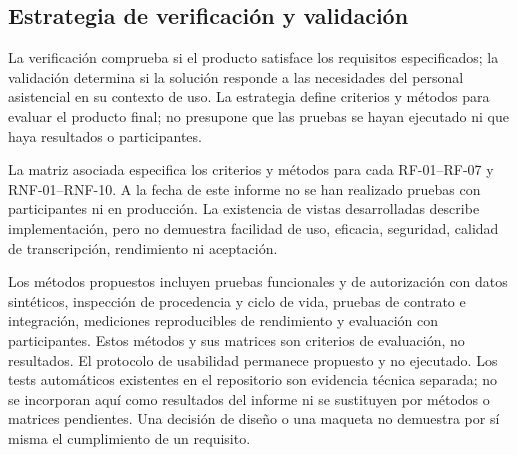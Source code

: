 \subsection{Estrategia de verificación y validación}

La verificación comprueba si el producto satisface los requisitos especificados; la validación determina si la solución responde a las necesidades del personal asistencial en su contexto de uso. La estrategia define criterios y métodos para evaluar el producto final; no presupone que las pruebas se hayan ejecutado ni que haya resultados o participantes.

La matriz asociada especifica los criterios y métodos para cada RF-01--RF-07 y RNF-01--RNF-10. A la fecha de este informe no se han realizado pruebas con participantes ni en producción. La existencia de vistas desarrolladas describe implementación, pero no demuestra facilidad de uso, eficacia, seguridad, calidad de transcripción, rendimiento ni aceptación.

Los métodos propuestos incluyen pruebas funcionales y de autorización con datos sintéticos, inspección de procedencia y ciclo de vida, pruebas de contrato e integración, mediciones reproducibles de rendimiento y evaluación con participantes. Estos métodos y sus matrices son criterios de evaluación, no resultados. El protocolo de usabilidad permanece propuesto y no ejecutado. Los tests automáticos existentes en el repositorio son evidencia técnica separada; no se incorporan aquí como resultados del informe ni se sustituyen por métodos o matrices pendientes. Una decisión de diseño o una maqueta no demuestra por sí misma el cumplimiento de un requisito.
